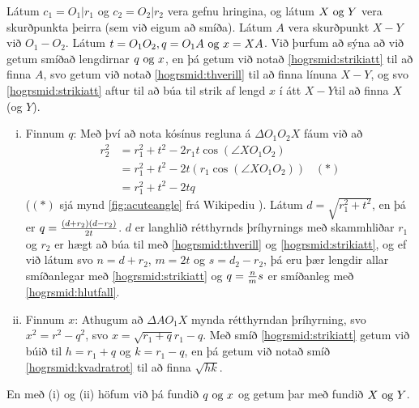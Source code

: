 \begin{frame}[allowframebreaks]
  \begin{hogrsmid}\label{hogrsmid:skphringja}
    Látum \(c_1 = O_1|r_1\) og \(c_2 = O_2|r_2\) vera gefnu hringina, og látum
    \(X \text{ og } Y\) vera skurðpunkta þeirra (sem við eigum að smíða).
    Látum \(A\) vera skurðpunkt \(X-Y\) við \(O_1-O_2\).
    Látum \(t = O_1O_2, q = O_1A \text{ og } x = XA\).
    Við þurfum að sýna að við getum smíðað lengdirnar \(q \text{ og } x\),
    en þá getum við notað \ref{hogrsmid:strikiatt} til að finna \(A\),
    svo getum við notað \ref{hogrsmid:thverill} til að finna línuna \(X-Y\),
    og svo \ref{hogrsmid:strikiatt} aftur til að
    búa til strik af lengd \(x\) í átt \(X-Y\)til að finna \(X\) (og \(Y\)).
  \end{hogrsmid}
  
    \begin{enumerate}[(i)]
      \item Finnum \(q\):
        Með því að nota kósínus regluna \cite{WikiCos} á
        \(\Delta O_1O_2X\) fáum við að
        \begin{align*}
          r_2^2 & = r_1^2 + t^2 - 2r_1 t \cos{(\angle XO_1O_2)}\\
                & = r_1^2 + t^2 - 2t(r_1  \cos{(\angle XO_1O_2)}) \;\;\;(*)\\
                & = r_1^2 + t^2 - 2tq
        \end{align*}
        (\((*)\)
        sjá mynd \ref{fig:acuteangle} frá Wikipediu \cite{WikiCos}).
        Látum \(d = \sqrt{r_1^2 + t^2}\),
        en þá er \(q = \frac{(d+r_2)(d-r_2)}{2t}\).
        \(d\)
        er langhlið rétthyrnds þríhyrnings með skammhliðar \(r_1\)
        og \(r_2\)
        er hægt að búa til með \ref{hogrsmid:thverill} og
        \ref{hogrsmid:strikiatt}, og ef við látum svo \(n = d+r_2\),
        \(m = 2t\)
        og \(s = d_2 -r_2\),
        þá eru þær lengdir allar smíðanlegar með
        \ref{hogrsmid:strikiatt} og \(q = \frac{n}{m}s\)
        er smíðanleg með \ref{hogrsmid:hlutfall}.
      \item Finnum \(x\):
        Athugum að \(\Delta AO_1X\)
        mynda rétthyrndan þríhyrning, svo \(x^2 = r^2 - q^2\),
        svo \(x = \sqrt{r_1+q}{r_1-q}\).
        Með smíð \ref{hogrsmid:strikiatt} getum við búið til
        \(h = r_1 +q\)
        og \(k = r_1 - q\),
        en þá getum við notað smíð \ref{hogrsmid:kvadratrot} til að
        finna \(\sqrt{hk}\).

    \end{enumerate}
    En með (i) og (ii) höfum við þá fundið \(q \text{ og } x\) og getum þar með
    fundið \(X \text{ og } Y\).
\end{frame}


